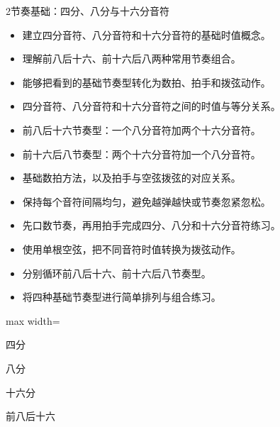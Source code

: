 \begin{lessoncard}{2}{节奏基础：四分、八分与十六分音符}
\begin{itemize}
\item 建立四分音符、八分音符和十六分音符的基础时值概念。
\item 理解前八后十六、前十六后八两种常用节奏组合。
\item 能够把看到的基础节奏型转化为数拍、拍手和拨弦动作。
\end{itemize}
\begin{itemize}
\item 四分音符、八分音符和十六分音符之间的时值与等分关系。
\item 前八后十六节奏型：一个八分音符加两个十六分音符。
\item 前十六后八节奏型：两个十六分音符加一个八分音符。
\item 基础数拍方法，以及拍手与空弦拨弦的对应关系。
\item 保持每个音符间隔均匀，避免越弹越快或节奏忽紧忽松。
\end{itemize}
\begin{itemize}
\item 先口数节奏，再用拍手完成四分、八分和十六分音符练习。
\item 使用单根空弦，把不同音符时值转换为拨弦动作。
\item 分别循环前八后十六、前十六后八节奏型。
\item 将四种基础节奏型进行简单排列与组合练习。
\end{itemize}
\begin{fignote}
\begin{center}
\begin{adjustbox}{max width=\textwidth}
\begin{rpattern}{四分}\end{rpattern}\hspace{9mm}%
\begin{rpattern}{八分}\end{rpattern}\hspace{9mm}%
\begin{rpattern}{十六分}\end{rpattern}\hspace{9mm}%
\begin{rpattern}{前八后十六}\end{rpattern}\hspace{9mm}%

\end{adjustbox}
\end{center}
\end{fignote}
\end{lessoncard}
